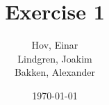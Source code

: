\newcommand{\mytitle}{Exercise 1}
\newcommand{\mygroupnumber}{5}
\newcommand{\myauthor}{Hov, Einar\\Lindgren, Joakim\\Bakken, Alexander}

\title{\mytitle}
\author{\myauthor}
\date{\today}
